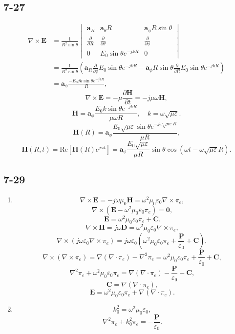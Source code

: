 \documentclass[6pt,a4paper]{article}
\begin{document}
\subsection{7-27}
\begin{align*}
\nabla\times\mathbf{E}&=\frac{1}{R^2\sin\theta}\begin{vmatrix}
\mathbf{a}_R & \mathbf{a}_\theta R & \mathbf{a}_\phi R\sin\theta \\
\frac{\partial}{\partial R} & \frac{\partial}{\partial\theta} & \frac{\partial}{\partial\phi} \\
0 & E_0\sin\theta e^{-jkR} & 0 \end{vmatrix}\\
&=\frac{1}{R^2\sin\theta}\left(\mathbf{a}_R\frac{\partial}{\partial\phi}E_0\sin\theta e^{-jkR}-\mathbf{a}_\phi R\sin\theta\frac{\partial}{\partial R}E_0\sin\theta e^{-jkR}\right)\\
&=\mathbf{a}_\phi\frac{-E_0jk\sin\theta e^{-jkR}}{R},
\end{align*}
$$\nabla\times\mathbf{E} = -\mu\frac{\partial\mathbf{H}}{\partial t}=-j\mu\omega\mathbf{H},$$
$$\mathbf{H}=\mathbf{a}_\phi\frac{E_0k\sin\theta e^{-jkR}}{\mu\omega R},\quad k=\omega\sqrt{\mu\varepsilon}.$$
$$\mathbf{H}(R)=\mathbf{a}_\phi\frac{E_0\sqrt{\mu\varepsilon}\sin\theta e^{-j\omega\sqrt{\mu\varepsilon}R}}{\mu R},$$
$$\mathbf{H}(R,t)=\text{Re}[\mathbf{H}(R)e^{j\omega t}]=\mathbf{a}_\phi\frac{E_0\sqrt{\mu\varepsilon}}{\mu R}\sin\theta\cos(\omega t-\omega\sqrt{\mu\varepsilon}R).$$

\subsection{7-29}

\begin{enumerate}[label=\alph*)]
\item
$$\nabla\times\mathbf{E}=-j\omega\mu_0\mathbf{H}=\omega^2\mu_0\varepsilon_0\nabla\times \pi_e,$$
$$\nabla\times(\mathbf{E}-\omega^2\mu_0\varepsilon_0\pi_e)=\mathbf{0},$$
$$\mathbf{E}=\omega^2\mu_0\varepsilon_0\pi_e+\mathbf{C}.$$
$$\nabla\times\mathbf{H}=j\omega\mathbf{D}=\omega^2\mu_0\varepsilon_0\nabla\times \pi_e,$$
$$\nabla\times(j\omega\varepsilon_0\nabla\times\pi_e)=j\omega\varepsilon_0(\omega^2\mu_0\varepsilon_0\pi_e+\frac{\mathbf{P}}{\varepsilon_0}+\mathbf{C}),$$
$$\nabla\times(\nabla\times\pi_e)=\nabla(\nabla\cdot\pi_e)-\nabla^2\pi_e=\omega^2\mu_0\varepsilon_0\pi_e+\frac{\mathbf{P}}{\varepsilon_0}+\mathbf{C},$$
$$\nabla^2\pi_e+\omega^2\mu_0\varepsilon_0\pi_e=\nabla(\nabla\cdot\pi_e)-\frac{\mathbf{P}}{\varepsilon_0}-\mathbf{C},$$
$$\mathbf{C}=\nabla(\nabla\cdot\pi_e),$$
$$\mathbf{E}=\omega^2\mu_0\varepsilon_0\pi_e+\nabla(\nabla\cdot\pi_e).$$
\item
$$k_0^2=\omega^2\mu_0\varepsilon_0,$$
$$\nabla^2\pi_e+k_0^2\pi_e=-\frac{\mathbf{P}}{\varepsilon_0}.$$
\end{enumerate}
\end{document}
